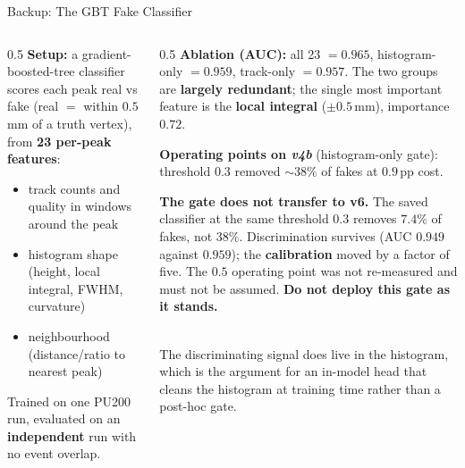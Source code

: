 \documentclass[xcolor=table,aspectratio=169]{beamer}
\begin{document}
\begin{frame}[shrink=15]{Backup: The GBT Fake Classifier}
    \begin{columns}[c]
        \begin{column}{0.5\linewidth}
            \small
            \textbf{Setup:} a gradient-boosted-tree classifier scores each peak real vs
            fake (real $=$ within $0.5$\,mm of a truth vertex), from \textbf{23 per-peak features}:
            \begin{itemize}\setlength\itemsep{0.2em}
                \item track counts and quality in windows around the peak
                \item histogram shape (height, local integral, FWHM, curvature)
                \item neighbourhood (distance/ratio to nearest peak)
            \end{itemize}
            \vspace{0.35em}
            Trained on one PU200 run, evaluated on an \textbf{independent} run with no event overlap.
        \end{column}
        \begin{column}{0.5\linewidth}
            \small
            \textbf{Ablation (AUC):} all 23 $=0.965$, histogram-only $=0.959$, track-only $=0.957$.
            The two groups are \textbf{largely redundant}; the single most important feature is the
            \textbf{local integral} ($\pm0.5$\,mm), importance $0.72$.
            \vspace{0.4em}

            \textbf{Operating points on \emph{v4b}} (histogram-only gate):
            threshold $0.3$ removed ${\sim}38\%$ of fakes at $0.9$\,pp cost.
            \vspace{0.35em}

            \setlength{\fboxsep}{4pt}
            \colorbox{pennred!8}{\parbox{0.95\linewidth}{\footnotesize
            \textcolor{pennred}{\textbf{The gate does not transfer to v6.}} The saved
            classifier at the same threshold $0.3$ removes \textbf{$7.4\%$} of fakes,
            not $38\%$. Discrimination survives (AUC $0.949$ against $0.959$); the
            \textbf{calibration} moved by a factor of five. The $0.5$ operating point
            was not re-measured and must not be assumed. \textbf{Do not deploy this
            gate as it stands.}}}
            \vspace{0.35em}\\
            {\footnotesize\textcolor{black!55}{The discriminating signal does live in
            the histogram, which is the argument for an in-model head that cleans the
            histogram at training time rather than a post-hoc gate.}}
        \end{column}
    \end{columns}
\end{frame}
\end{document}
